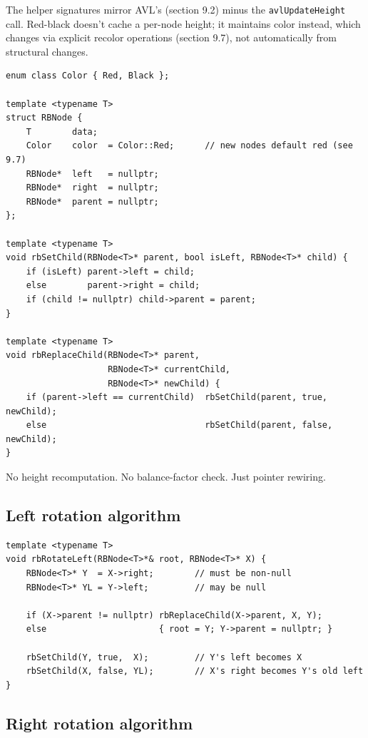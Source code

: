 \documentclass[11pt]{article}
\begin{document}
The helper signatures mirror AVL's (section 9.2) minus the \texttt{avlUpdateHeight} call. Red-black doesn't cache a per-node height; it maintains color instead, which changes via explicit recolor operations (section 9.7), not automatically from structural changes.

\begin{lstlisting}
enum class Color { Red, Black };

template <typename T>
struct RBNode {
    T        data;
    Color    color  = Color::Red;      // new nodes default red (see 9.7)
    RBNode*  left   = nullptr;
    RBNode*  right  = nullptr;
    RBNode*  parent = nullptr;
};

template <typename T>
void rbSetChild(RBNode<T>* parent, bool isLeft, RBNode<T>* child) {
    if (isLeft) parent->left = child;
    else        parent->right = child;
    if (child != nullptr) child->parent = parent;
}

template <typename T>
void rbReplaceChild(RBNode<T>* parent,
                    RBNode<T>* currentChild,
                    RBNode<T>* newChild) {
    if (parent->left == currentChild)  rbSetChild(parent, true,  newChild);
    else                               rbSetChild(parent, false, newChild);
}
\end{lstlisting}

No height recomputation. No balance-factor check. Just pointer rewiring.

\subsection*{Left rotation algorithm}

\begin{lstlisting}
template <typename T>
void rbRotateLeft(RBNode<T>*& root, RBNode<T>* X) {
    RBNode<T>* Y  = X->right;        // must be non-null
    RBNode<T>* YL = Y->left;         // may be null

    if (X->parent != nullptr) rbReplaceChild(X->parent, X, Y);
    else                      { root = Y; Y->parent = nullptr; }

    rbSetChild(Y, true,  X);         // Y's left becomes X
    rbSetChild(X, false, YL);        // X's right becomes Y's old left
}
\end{lstlisting}

\subsection*{Right rotation algorithm}
\end{document}
